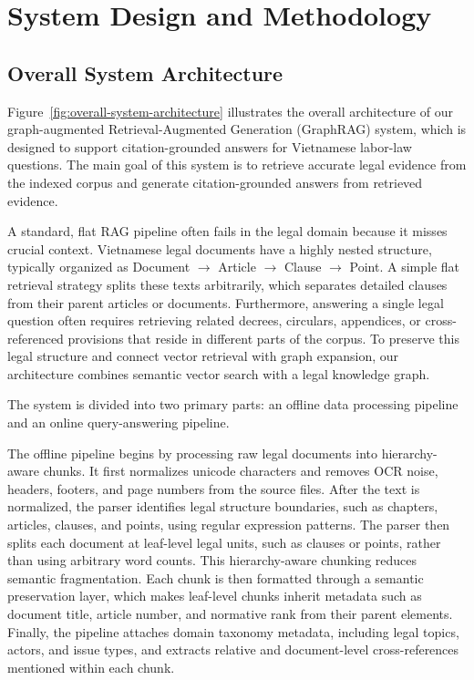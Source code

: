 \chapter{System Design and Methodology}

\section{Overall System Architecture}
\label{sec:overall-system-architecture}

Figure~\ref{fig:overall-system-architecture} illustrates the overall architecture of our graph-augmented Retrieval-Augmented Generation (GraphRAG) system, which is designed to support citation-grounded answers for Vietnamese labor-law questions. The main goal of this system is to retrieve accurate legal evidence from the indexed corpus and generate citation-grounded answers from retrieved evidence.

A standard, flat RAG pipeline often fails in the legal domain because it misses crucial context. Vietnamese legal documents have a highly nested structure, typically organized as Document $\rightarrow$ Article $\rightarrow$ Clause $\rightarrow$ Point. A simple flat retrieval strategy splits these texts arbitrarily, which separates detailed clauses from their parent articles or documents. Furthermore, answering a single legal question often requires retrieving related decrees, circulars, appendices, or cross-referenced provisions that reside in different parts of the corpus. To preserve this legal structure and connect vector retrieval with graph expansion, our architecture combines semantic vector search with a legal knowledge graph.

The system is divided into two primary parts: an offline data processing pipeline and an online query-answering pipeline.

The offline pipeline begins by processing raw legal documents into hierarchy-aware chunks. It first normalizes unicode characters and removes OCR noise, headers, footers, and page numbers from the source files. After the text is normalized, the parser identifies legal structure boundaries, such as chapters, articles, clauses, and points, using regular expression patterns. The parser then splits each document at leaf-level legal units, such as clauses or points, rather than using arbitrary word counts. This hierarchy-aware chunking reduces semantic fragmentation. Each chunk is then formatted through a semantic preservation layer, which makes leaf-level chunks inherit metadata such as document title, article number, and normative rank from their parent elements. Finally, the pipeline attaches domain taxonomy metadata, including legal topics, actors, and issue types, and extracts relative and document-level cross-references mentioned within each chunk.


